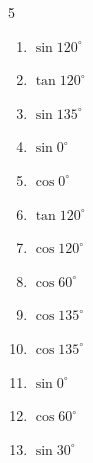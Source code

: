 \begin{multicols}{5}
\begin{enumerate}
        \phantom{$\displaystyle なし$}

  \item $\displaystyle \sin{120^\circ}$


  \item $\displaystyle \tan{120^\circ}$


  \item $\displaystyle \sin{135^\circ}$


  \item $\displaystyle \sin{0^\circ}$

        \phantom{$\displaystyle =0$}

  \item $\displaystyle \cos{0^\circ}$

        \phantom{$\displaystyle =1$}

  \item $\displaystyle \tan{120^\circ}$


  \item $\displaystyle \cos{120^\circ}$


  \item $\displaystyle \cos{60^\circ}$


  \item $\displaystyle \cos{135^\circ}$


  \item $\displaystyle \cos{135^\circ}$


  \item $\displaystyle \sin{0^\circ}$

        \phantom{$\displaystyle =0$}

  \item $\displaystyle \cos{60^\circ}$


  \item $\displaystyle \sin{30^\circ}$


\end{enumerate}
\end{multicols}

